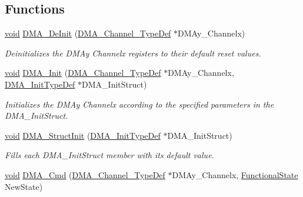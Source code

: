 \subsection*{Functions}
\begin{DoxyCompactItemize}
\item 
\hyperlink{usb__devapi_8h_afabf60e7f57651d6d595a02c75f07cd0}{void} \hyperlink{group___d_m_a___private___functions_ga21ca0d50b13e502db5ab5feb484f9ece}{D\+M\+A\+\_\+\+De\+Init} (\hyperlink{struct_d_m_a___channel___type_def}{D\+M\+A\+\_\+\+Channel\+\_\+\+Type\+Def} $\ast$D\+M\+Ay\+\_\+\+Channelx)
\begin{DoxyCompactList}\small\item\em Deinitializes the D\+M\+Ay Channelx registers to their default reset values. \end{DoxyCompactList}\item 
\hyperlink{usb__devapi_8h_afabf60e7f57651d6d595a02c75f07cd0}{void} \hyperlink{group___d_m_a___private___functions_ga7c3d1b9dc041f8e5f2cfc8d5dd858278}{D\+M\+A\+\_\+\+Init} (\hyperlink{struct_d_m_a___channel___type_def}{D\+M\+A\+\_\+\+Channel\+\_\+\+Type\+Def} $\ast$D\+M\+Ay\+\_\+\+Channelx, \hyperlink{struct_d_m_a___init_type_def}{D\+M\+A\+\_\+\+Init\+Type\+Def} $\ast$D\+M\+A\+\_\+\+Init\+Struct)
\begin{DoxyCompactList}\small\item\em Initializes the D\+M\+Ay Channelx according to the specified parameters in the D\+M\+A\+\_\+\+Init\+Struct. \end{DoxyCompactList}\item 
\hyperlink{usb__devapi_8h_afabf60e7f57651d6d595a02c75f07cd0}{void} \hyperlink{group___d_m_a___private___functions_ga0f7f95f750a90a6824f4e9b6f58adc7e}{D\+M\+A\+\_\+\+Struct\+Init} (\hyperlink{struct_d_m_a___init_type_def}{D\+M\+A\+\_\+\+Init\+Type\+Def} $\ast$D\+M\+A\+\_\+\+Init\+Struct)
\begin{DoxyCompactList}\small\item\em Fills each D\+M\+A\+\_\+\+Init\+Struct member with its default value. \end{DoxyCompactList}\item 
\hyperlink{usb__devapi_8h_afabf60e7f57651d6d595a02c75f07cd0}{void} \hyperlink{group___d_m_a___private___functions_ga8e7cb6b9ae5f142e2961df879cdaba65}{D\+M\+A\+\_\+\+Cmd} (\hyperlink{struct_d_m_a___channel___type_def}{D\+M\+A\+\_\+\+Channel\+\_\+\+Type\+Def} $\ast$D\+M\+Ay\+\_\+\+Channelx, \hyperlink{agilefox_2library_2inc_2stm32f10x__type_8h_ac9a7e9a35d2513ec15c3b537aaa4fba1}{Functional\+State} New\+State)

\end{DoxyCompactItemize}
